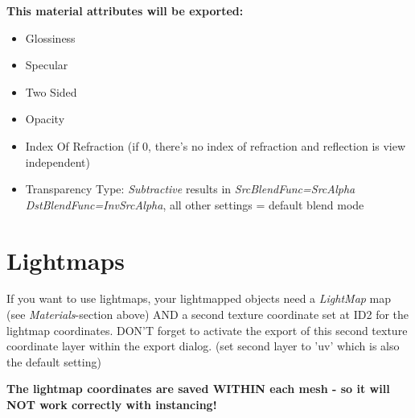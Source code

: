 \textbf{This material attributes will be exported:}
\begin{itemize}
\item{Glossiness}
\item{Specular}
\item{Two Sided}
\item{Opacity}
\item{Index Of Refraction (if 0, there's no index of refraction and reflection is view independent)}
\item{Transparency Type: \emph{Subtractive} results in \emph{SrcBlendFunc=SrcAlpha  DstBlendFunc=InvSrcAlpha}, all other settings = default blend mode}
\end{itemize}




\section{Lightmaps}
If you want to use lightmaps, your lightmapped objects need a \emph{LightMap} map (see \emph{Materials}-section above) AND a second texture coordinate set at ID2 for the lightmap coordinates. DON'T forget to activate the export of this second texture coordinate layer within the export dialog. (set second layer to 'uv' which is also the default setting)

\textbf{The lightmap coordinates are saved WITHIN each mesh - so it will NOT work correctly with instancing!}
